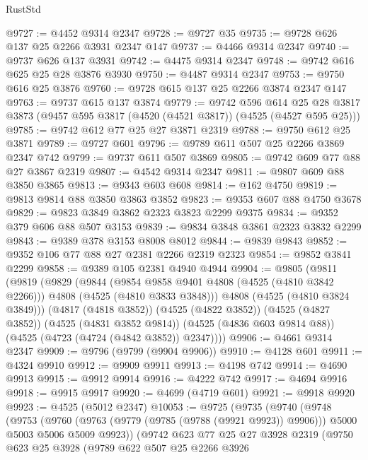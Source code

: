 \begin{lexlean}{RustStd}
\begin{coremodule}
@9727 := @4452 @9314 @2347
@9728 := @9727 @35
@9735 := @9728 @626 @137 @25 @2266 @3931 @2347 @147
@9737 := @4466 @9314 @2347
@9740 := @9737 @626 @137 @3931
@9742 := @4475 @9314 @2347
@9748 := @9742 @616 @625 @25 @28 @3876 @3930
@9750 := @4487 @9314 @2347
@9753 := @9750 @616 @25 @3876
@9760 := @9728 @615 @137 @25 @2266 @3874 @2347 @147
@9763 := @9737 @615 @137 @3874
@9779 := @9742
    @596
    @614
    @25
    @28
    @3817
    @3873
    (@9457 @595 @3817 (@4520 (@4521 @3817)) (@4525 (@4527 @595 @25)))
@9785 := @9742 @612 @77 @25 @27 @3871 @2319
@9788 := @9750 @612 @25 @3871
@9789 := @9727 @601
@9796 := @9789 @611 @507 @25 @2266 @3869 @2347 @742
@9799 := @9737 @611 @507 @3869
@9805 := @9742 @609 @77 @88 @27 @3867 @2319
@9807 := @4542 @9314 @2347
@9811 := @9807 @609 @88 @3850 @3865
@9813 := @9343 @603 @608
@9814 := @162 @4750
@9819 := @9813 @9814 @88 @3850 @3863 @3852
@9823 := @9353 @607 @88 @4750 @3678
@9829 := @9823 @3849 @3862 @2323 @3823 @2299 @9375
@9834 := @9352 @379 @606 @88 @507 @3153
@9839 := @9834 @3848 @3861 @2323 @3832 @2299
@9843 := @9389 @378 @3153 @8008 @8012
@9844 := @9839 @9843
@9852 := @9352 @106 @77 @88 @27 @2381 @2266 @2319 @2323
@9854 := @9852 @3841 @2299
@9858 := @9389 @105 @2381 @4940 @4944
@9904 := @9805
    (@9811
      (@9819
        (@9829
          (@9844
            (@9854 @9858 @9401 @4808 (@4525 (@4810 @3842 @2266)))
            @4808
            (@4525 (@4810 @3833 @3848)))
          @4808
          (@4525 (@4810 @3824 @3849)))
        (@4817 (@4818 @3852))
        (@4525 (@4822 @3852))
        (@4525 (@4827 @3852))
        (@4525 (@4831 @3852 @9814))
        (@4525 (@4836 @603 @9814 @88))
        (@4525 (@4723 (@4724 (@4842 @3852)) @2347))))
@9906 := @4661 @9314 @2347
@9909 := @9796 (@9799 (@9904 @9906))
@9910 := @4128 @601
@9911 := @4324 @9910
@9912 := @9909 @9911
@9913 := @4198 @742
@9914 := @4690 @9913
@9915 := @9912 @9914
@9916 := @4222 @742
@9917 := @4694 @9916
@9918 := @9915 @9917
@9920 := @4699 (@4719 @601)
@9921 := @9918 @9920
@9923 := @4525 (@5012 @2347)
@10053 := @9725
    (@9735
      (@9740
        (@9748
          (@9753
            (@9760
              (@9763 (@9779 (@9785 (@9788 (@9921 @9923)) @9906)))
              @5000
              @5003
              @5006
              @5009
              @9923))
          (@9742
            @623
            @77
            @25
            @27
            @3928
            @2319
            (@9750
              @623
              @25
              @3928
              (@9789
                @622
                @507
                @25
                @2266
                @3926

\end{coremodule}
\end{lexlean}

